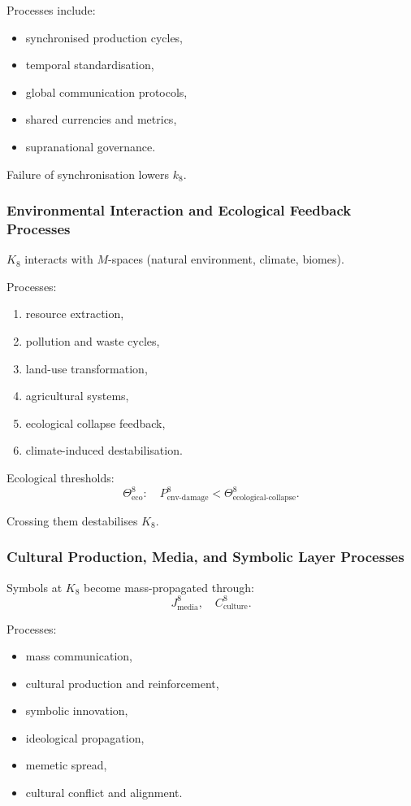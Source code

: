 Processes include:
\begin{itemize}
    \item synchronised production cycles,
    \item temporal standardisation,
    \item global communication protocols,
    \item shared currencies and metrics,
    \item supranational governance.
\end{itemize}

Failure of synchronisation lowers $k_8$.

\subsubsection{Environmental Interaction and Ecological Feedback Processes}

$K_8$ interacts with $M$-spaces (natural environment, climate, biomes).

Processes:
\begin{enumerate}
    \item resource extraction,
    \item pollution and waste cycles,
    \item land-use transformation,
    \item agricultural systems,
    \item ecological collapse feedback,
    \item climate-induced destabilisation.
\end{enumerate}

Ecological thresholds:
\[
\Theta^8_{\text{eco}}: \quad
P^8_{\text{env-damage}} < \Theta^8_{\text{ecological-collapse}}.
\]

Crossing them destabilises $K_8$.

\subsubsection{Cultural Production, Media, and Symbolic Layer Processes}

Symbols at $K_8$ become mass-propagated through:
\[
J^8_{\text{media}},\quad
C^8_{\text{culture}}.
\]

Processes:
\begin{itemize}
    \item mass communication,
    \item cultural production and reinforcement,
    \item symbolic innovation,
    \item ideological propagation,
    \item memetic spread,
    \item cultural conflict and alignment.
\end{itemize}

